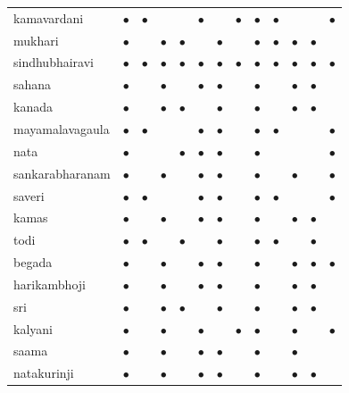 \begin{table}
\begin{tabular}{ l : L{0.17cm} : L{0.31cm} : L{0.31cm} : L{0.82cm} : L{0.31cm} : L{0.31cm} : L{0.31cm} : L{0.17cm} : L{0.31cm} : L{0.82cm} : L{0.82cm} : L{0.31cm}: }
			\gls{kamavardani} & $\bullet$ & $\bullet$ &  &  & $\bullet$ &  & $\bullet$ & $\bullet$ & $\bullet$ &  &  & $\bullet$\tabularnewline
			\gls{mukhari} & $\bullet$ &  & $\bullet$ & $\bullet$ &  & $\bullet$ &  & $\bullet$ & $\bullet$ & $\bullet$ & $\bullet$ & \tabularnewline
			\gls{sindhubhairavi} & $\bullet$ & $\bullet$ & $\bullet$ & $\bullet$ & $\bullet$  & $\bullet$ & $\bullet$ & $\bullet$ & $\bullet$ &$\bullet$ & $\bullet$ &  $\bullet$ \tabularnewline
			\gls{sahana} & $\bullet$ &  & $\bullet$ &  & $\bullet$ & $\bullet$ &  & $\bullet$ &  & $\bullet$ & $\bullet$ & \tabularnewline
			\gls{kanada} & $\bullet$ &  & $\bullet$ & $\bullet$ &  & $\bullet$ &  & $\bullet$ &  & $\bullet$ & $\bullet$ & \tabularnewline
			\gls{mayamalavagaula} & $\bullet$ & $\bullet$ &  &  & $\bullet$ & $\bullet$ &  & $\bullet$ & $\bullet$ &  &  & $\bullet$\tabularnewline
			\gls{nata} & $\bullet$ &  &  & $\bullet$ & $\bullet$ & $\bullet$ &  & $\bullet$ &  &  &  & $\bullet$\tabularnewline
			\gls{sankarabharanam} & $\bullet$ &  & $\bullet$ &  & $\bullet$ & $\bullet$ &  & $\bullet$ &  & $\bullet$ &  & $\bullet$\tabularnewline
			\gls{saveri} & $\bullet$ & $\bullet$ &  &  & $\bullet$ & $\bullet$ &  & $\bullet$ & $\bullet$ &  &  & $\bullet$ \tabularnewline
			\gls{kamas} & $\bullet$ &  & $\bullet$ &  & $\bullet$ & $\bullet$ &  & $\bullet$ &  & $\bullet$ & $\bullet$ & \tabularnewline
			\gls{todi} & $\bullet$ & $\bullet$ &  & $\bullet$ &  & $\bullet$ &  & $\bullet$ & $\bullet$ &  &  $\bullet$  &\tabularnewline
			\gls{begada} & $\bullet$ &  & $\bullet$ &  & $\bullet$ & $\bullet$ &  & $\bullet$ &  & $\bullet$ & $\bullet$ & $\bullet$\tabularnewline
			\gls{harikambhoji} & $\bullet$ &  & $\bullet$ &  & $\bullet$ & $\bullet$ &  & $\bullet$ &  & $\bullet$ & $\bullet$ & \tabularnewline
			\gls{sri} & $\bullet$ &  & $\bullet$ & $\bullet$ &  & $\bullet$ &  & $\bullet$ &  &  $\bullet$ & $\bullet$ & \tabularnewline
			\gls{kalyani} & $\bullet$ &  & $\bullet$ &  & $\bullet$ &  & $\bullet$ & $\bullet$ &  & $\bullet$ &  & $\bullet$\tabularnewline
			\gls{saama} & $\bullet$ &  & $\bullet$ &  & $\bullet$ & $\bullet$ &  & $\bullet$ &  & $\bullet$ &  & \tabularnewline
			\gls{natakurinji} & $\bullet$ &  & $\bullet$ &  & $\bullet$ & $\bullet$ &  & $\bullet$ &  & $\bullet$ & $\bullet$ & \tabularnewline

\end{tabular}
\end{table}
